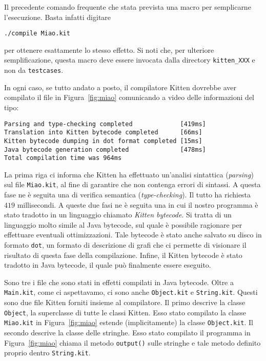 Il precedente comando
\e \cosi frequente che \e stata prevista una macro per semplicarne
l'esecuzione. Basta infatti digitare
%
\begin{verbatim}
./compile Miao.kit
\end{verbatim}
%
per ottenere esattamente lo stesso effetto. Si noti che, per ulteriore
semplificazione, questa macro deve essere invocata dalla directory
\texttt{kitten\_XXX} e non da \texttt{testcases}.

In ogni caso, se tutto \e andato a posto, il compilatore Kitten dovrebbe
aver compilato il file in Figura~\ref{fig:miao} comunicando a video delle
informazioni del tipo:
%
\begin{verbatim}
Parsing and type-checking completed             [419ms]
Translation into Kitten bytecode completed      [66ms]
Kitten bytecode dumping in dot format completed [15ms]
Java bytecode generation completed              [478ms]
Total compilation time was 964ms
\end{verbatim}
%
La prima riga ci informa che Kitten ha effettuato un'analisi sintattica
(\emph{parsing}) sul file \texttt{Miao.kit}, al fine di garantire che non
contenga errori di sintassi. A questa fase ne \`e seguita una di verifica
semantica (\emph{type-checking}). Il tutto ha richiesta $419$ millisecondi.
A queste due fasi ne \`e seguita una in cui il nostro programma \`e
stato tradotto in un linguaggio chiamato \emph{Kitten bytecode}. Si tratta
di un linguaggio molto simile al Java bytecode, sul quale \`e possibile
ragionare per effettuare eventuali ottimizzazioni. Tale bytecode \`e
stato anche salvato su disco in formato \texttt{dot}, un
formato di descrizione di grafi che ci permette di visionare il risultato
di questa fase della compilazione. Infine, il Kitten bytecode \`e stato
tradotto in Java bytecode, il quale pu\`o finalmente essere eseguito.

Sono tre i file che sono stati in effetti compilati in Java
bytecode. Oltre a \texttt{Main.kit}, come ci aspettavamo, ci sono anche
\texttt{Object.kit} e \texttt{String.kit}. Questi sono due file Kitten
forniti insieme al compilatore. Il primo descrive la
classe \texttt{Object}, \cioe la superclasse di tutte le classi
Kitten. Esso \e stato compilato \poiche la classe \texttt{Miao.kit}
in Figura~\ref{fig:miao} estende (implicitamente) la classe
\texttt{Object.kit}. Il secondo descrive la classe delle stringhe.
Esso \e stato compilato \poiche il programma in Figura~\ref{fig:miao}
chiama il metodo \texttt{output()} sulle stringhe e tale metodo \e
definito proprio dentro \texttt{String.kit}.

